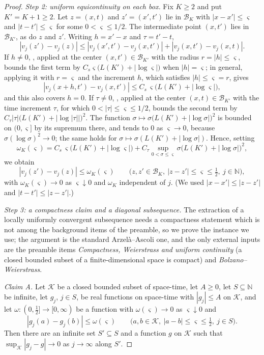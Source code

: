 \begin{proof}
\emph{Step 2: uniform equicontinuity on each box.}
Fix $K\ge2$ and put $K'=K+1\ge2$. Let $z=(x,t)$ and $z'=(x',t')$ lie in
$\mathcal B_K$ with $|x-x'|\le\varsigma$ and $|t-t'|\le\varsigma$ for some
$0<\varsigma\le1/2$. The intermediate point $(x,t')$ lies in $\mathcal B_{K'}$,
as do $z$ and $z'$. Writing $h=x'-x$ and $\tau=t'-t$,
\[
  |v_j(z')-v_j(z)|\le|v_j(x',t')-v_j(x,t')|+|v_j(x,t')-v_j(x,t)| .
\]
If $h\ne0$, , applied at the center
$(x,t')\in\mathcal B_{K'}$ with the radius $r=|h|\le\varsigma$, bounds the first
term by $C_s\varsigma\bigl(L(K')+|\log\varsigma|\bigr)$ when
$|h|=\varsigma$; in general, applying it with $r=\varsigma$ and the increment
$h$, which satisfies $|h|\le\varsigma=r$, gives
\[
  |v_j(x+h,t')-v_j(x,t')|\le C_s\,\varsigma\bigl(L(K')+|\log\varsigma|\bigr),
\]
and this also covers $h=0$. If $\tau\ne0$, , applied at
the center $(x,t)\in\mathcal B_{K'}$ with the time increment $\tau$, for which
$0<|\tau|\le\varsigma\le1/2$, bounds the second term by
$C_\tau|\tau|\bigl(L(K')+|\log|\tau||\bigr)^2$. The function
$\sigma\mapsto\sigma\bigl(L(K')+|\log\sigma|\bigr)^2$ is bounded on
$(0,\varsigma]$ by its supremum there, and tends to $0$ as $\varsigma\to0$,
because $\sigma(\log\sigma)^2\to0$; the same holds for
$\sigma\mapsto\sigma(L(K')+|\log\sigma|)$. Hence, setting
\[
  \omega_{K}(\varsigma)
   =C_s\,\varsigma\bigl(L(K')+|\log\varsigma|\bigr)
    +C_\tau\sup_{0<\sigma\le\varsigma}
      \sigma\bigl(L(K')+|\log\sigma|\bigr)^2 ,
\]
we obtain
\begin{equation}\label{eq:cc-equi}
  |v_j(z')-v_j(z)|\le\omega_K(\varsigma)
  \qquad\bigl(z,z'\in\mathcal B_K,\ |z-z'|\le\varsigma\le\tfrac12,\ j\in\mathbb N\bigr),
\end{equation}
with $\omega_K(\varsigma)\to0$ as $\varsigma\downarrow0$ and $\omega_K$
independent of $j$. (We used $|x-x'|\le|z-z'|$ and $|t-t'|\le|z-z'|$.)

\emph{Step 3: a compactness claim and a diagonal subsequence.}
The extraction of a locally uniformly convergent subsequence needs a compactness
statement which is not among the background items of the preamble, so we prove
the instance we use; the argument is the standard Arzel\`a--Ascoli one, and the
only external inputs are the preamble items \emph{Compactness, Weierstrass and
uniform continuity} (a closed bounded subset of a finite-dimensional space is
compact) and \emph{Bolzano--Weierstrass}.

\emph{Claim A.} Let $\mathcal K$ be a closed bounded subset of space-time, let
$A\ge0$, let $S\subseteq\mathbb N$ be infinite, let $g_j$, $j\in S$, be real
functions on space-time with $|g_j|\le A$ on $\mathcal K$, and let
$\omega:(0,\tfrac12]\to[0,\infty)$ be a function with
$\omega(\varsigma)\to0$ as $\varsigma\downarrow0$ and
\[
  |g_j(a)-g_j(b)|\le\omega(\varsigma)
  \qquad\bigl(a,b\in\mathcal K,\ |a-b|\le\varsigma\le\tfrac12,\ j\in S\bigr).
\]
Then there are an infinite set $S'\subseteq S$ and a function $g$ on
$\mathcal K$ such that $\sup_{\mathcal K}|g_j-g|\to0$ as $j\to\infty$ along
$S'$.


\end{proof}
